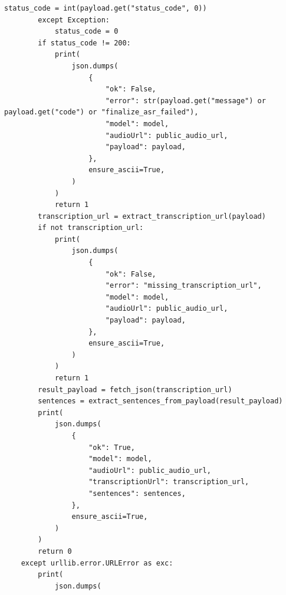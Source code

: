 \documentclass[12pt,a4paper]{article}
\begin{document}
\begin{Verbatim}[fontsize=\footnotesize]
            status_code = int(payload.get("status_code", 0))
        except Exception:
            status_code = 0
        if status_code != 200:
            print(
                json.dumps(
                    {
                        "ok": False,
                        "error": str(payload.get("message") or payload.get("code") or "finalize_asr_failed"),
                        "model": model,
                        "audioUrl": public_audio_url,
                        "payload": payload,
                    },
                    ensure_ascii=True,
                )
            )
            return 1
        transcription_url = extract_transcription_url(payload)
        if not transcription_url:
            print(
                json.dumps(
                    {
                        "ok": False,
                        "error": "missing_transcription_url",
                        "model": model,
                        "audioUrl": public_audio_url,
                        "payload": payload,
                    },
                    ensure_ascii=True,
                )
            )
            return 1
        result_payload = fetch_json(transcription_url)
        sentences = extract_sentences_from_payload(result_payload)
        print(
            json.dumps(
                {
                    "ok": True,
                    "model": model,
                    "audioUrl": public_audio_url,
                    "transcriptionUrl": transcription_url,
                    "sentences": sentences,
                },
                ensure_ascii=True,
            )
        )
        return 0
    except urllib.error.URLError as exc:
        print(
            json.dumps(
\end{Verbatim}
\newpage
{}
\fancyhead[R]{}
\end{document}

